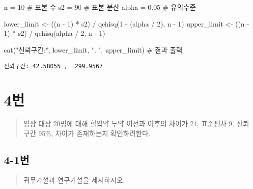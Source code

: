 \documentclass[
  letterpaper,
  DIV=11,
  numbers=noendperiod]{scrreprt}
\newenvironment{Shaded}{\begin{snugshade}}{\end{snugshade}}
\newcommand{\CommentTok}[1]{\textcolor[rgb]{0.37,0.37,0.37}{#1}}
\newcommand{\DecValTok}[1]{\textcolor[rgb]{0.68,0.00,0.00}{#1}}
\newcommand{\FloatTok}[1]{\textcolor[rgb]{0.68,0.00,0.00}{#1}}
\newcommand{\FunctionTok}[1]{\textcolor[rgb]{0.28,0.35,0.67}{#1}}
\newcommand{\NormalTok}[1]{\textcolor[rgb]{0.00,0.23,0.31}{#1}}
\newcommand{\OtherTok}[1]{\textcolor[rgb]{0.00,0.23,0.31}{#1}}
\newcommand{\SpecialCharTok}[1]{\textcolor[rgb]{0.37,0.37,0.37}{#1}}
\newcommand{\StringTok}[1]{\textcolor[rgb]{0.13,0.47,0.30}{#1}}
\begin{document}
\begin{Shaded}
\begin{Highlighting}[]
\NormalTok{n }\OtherTok{=} \DecValTok{10} \CommentTok{\# 표본 수}
\NormalTok{s2 }\OtherTok{=} \DecValTok{90} \CommentTok{\#  표본 분산}
\NormalTok{alpha }\OtherTok{=} \FloatTok{0.05} \CommentTok{\# 유의수준}

\NormalTok{lower\_limit }\OtherTok{\textless{}{-}}\NormalTok{ ((n }\SpecialCharTok{{-}} \DecValTok{1}\NormalTok{) }\SpecialCharTok{*}\NormalTok{ s2) }\SpecialCharTok{/} \FunctionTok{qchisq}\NormalTok{(}\DecValTok{1} \SpecialCharTok{{-}}\NormalTok{ (alpha }\SpecialCharTok{/} \DecValTok{2}\NormalTok{), n }\SpecialCharTok{{-}} \DecValTok{1}\NormalTok{)}
\NormalTok{upper\_limit }\OtherTok{\textless{}{-}}\NormalTok{ ((n }\SpecialCharTok{{-}} \DecValTok{1}\NormalTok{) }\SpecialCharTok{*}\NormalTok{ s2) }\SpecialCharTok{/} \FunctionTok{qchisq}\NormalTok{(alpha }\SpecialCharTok{/} \DecValTok{2}\NormalTok{, n }\SpecialCharTok{{-}} \DecValTok{1}\NormalTok{)}

\FunctionTok{cat}\NormalTok{(}\StringTok{"신뢰구간:"}\NormalTok{, lower\_limit, }\StringTok{", "}\NormalTok{, upper\_limit)  }\CommentTok{\# 결과 출력}
\end{Highlighting}
\end{Shaded}

\begin{verbatim}
신뢰구간: 42.58055 ,  299.9567
\end{verbatim}

\hypertarget{uxbc88-53}{%
\chapter*{4번}\label{uxbc88-53}}


\begin{quote}
임상 대상 20명에 대해 혈압약 투약 이전과 이후의 차이가 24, 표준편차 9,
신뢰구간 95\%, 차이가 존재하는지 확인하려한다.
\end{quote}

\hypertarget{uxbc88-54}{%
\section*{4-1번}\label{uxbc88-54}}


\begin{quote}
귀무가설과 연구가설을 제시하시오.
\end{quote}
\end{document}
